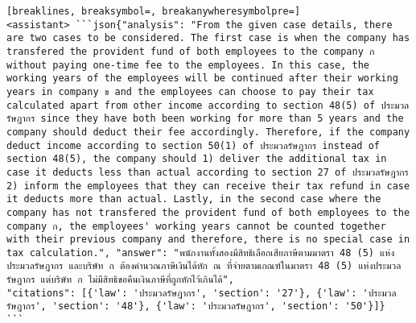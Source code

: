 \begin{Verbatim}[breaklines, breaksymbol=, breakanywheresymbolpre=]
<assistant> ```json{"analysis": "From the given case details, there are two cases to be considered. The first case is when the company has transfered the provident fund of both employees to the company ก without paying one-time fee to the employees. In this case, the working years of the employees will be continued after their working years in company ข and the employees can choose to pay their tax calculated apart from other income according to section 48(5) of ประมวลรัษฎากร since they have both been working for more than 5 years and the company should deduct their fee accordingly. Therefore, if the company deduct income according to section 50(1) of ประมวลรัษฎากร instead of section 48(5), the company should 1) deliver the additional tax in case it deducts less than actual according to section 27 of ประมวลรัษฎากร 2) inform the employees that they can receive their tax refund in case it deducts more than actual. Lastly, in the second case where the company has not transfered the provident fund of both employees to the company ก, the employees' working years cannot be counted together with their previous company and therefore, there is no special case in tax calculation.", "answer": "พนักงานทั้งสองมีสิทธิเลือกเสียภาษีตามมาตรา 48 (5) แห่งประมวลรัษฎากร และบริษัท ก ต้องคำนวณภาษีเงินได้หัก ณ ที่จ่ายตามเกณฑ์ในมาตรา 48 (5) แห่งประมวลรัษฎากร แต่บริษัท ก ไม่มีสิทธิขอคืนเงินภาษีที่ถูกหักไว้เกินได้",
"citations": [{'law': 'ประมวลรัษฎากร', 'section': '27'}, {'law': 'ประมวลรัษฎากร', 'section': '48'}, {'law': 'ประมวลรัษฎากร', 'section': '50'}]}
```
\end{Verbatim}